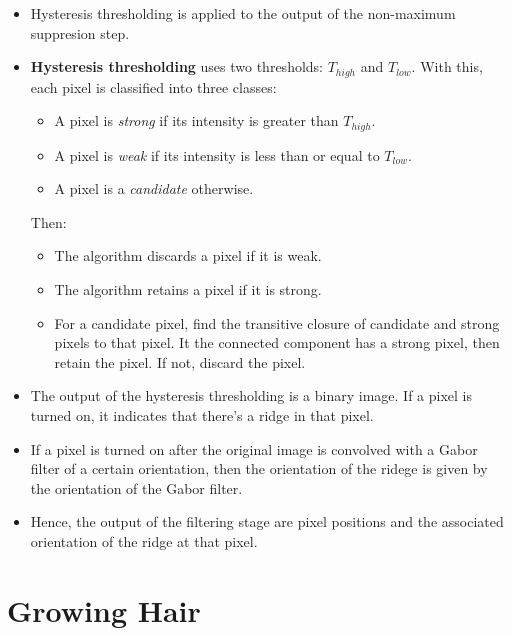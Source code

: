\documentclass[10pt]{article}
\begin{document}
\begin{itemize}
		\item Hysteresis thresholding is applied to the output of the non-maximum suppresion step.
    
    \item {\bf Hysteresis thresholding} uses two thresholds: $T_{high}$ and $T_{low}$. With this, each pixel is classified into three classes:
    \begin{itemize}
      \item A pixel is \emph{strong} if its intensity is greater than $T_{high}$.
      \item A pixel is \emph{weak} if its intensity is less than or equal to $T_{low}$.
      \item A pixel is a \emph{candidate} otherwise.
    \end{itemize}
    
    Then:
    \begin{itemize}
      \item The algorithm discards a pixel if it is weak.
      \item The algorithm retains a pixel if it is strong.
      \item For a candidate pixel, find the transitive closure of candidate and strong pixels to that pixel. It the connected component has a strong pixel, then retain the pixel. If not, discard the pixel.
    \end{itemize}
    
    \item The output of the hysteresis thresholding is a binary image. If a pixel is turned on, it indicates that there's a ridge in that pixel.
    
    \item If a pixel is turned on after the original image is convolved with a Gabor filter of a certain orientation, then the orientation of the ridege is given by the orientation of the Gabor filter.
    
    \item Hence, the output of the filtering stage are pixel positions and the associated orientation of the ridge at that pixel.
	\end{itemize}
	
	\section{Growing Hair} %
	\label{sec:growing_hair}
	
\end{document}
